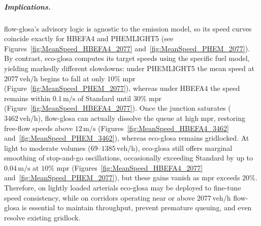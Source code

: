 \subparagraph*{Implications.}
\ac{flow-glosa}’s advisory logic is agnostic to the emission model, so its speed curves coincide exactly for HBEFA4 and PHEMLIGHT5 (see Figures~\ref{fig:MeanSpeed_HBEFA4_2077} and~\ref{fig:MeanSpeed_PHEM_2077}). By contrast, \ac{eco-glosa} computes its target speeds using the specific fuel model, yielding markedly different slowdowns: under PHEMLIGHT5 the mean speed at $2077\,\mathrm{veh/h}$ begins to fall at only $10\%$ \ac{mpr} (Figure~\ref{fig:MeanSpeed_PHEM_2077}), whereas under HBEFA4 the speed remains within $0.1\,\mathrm{m/s}$ of Standard until $30\%$ \ac{mpr} (Figure~\ref{fig:MeanSpeed_HBEFA4_2077}). Once the junction saturates ($3462\,\mathrm{veh/h}$), \ac{flow-glosa} can actually dissolve the queue at high \ac{mpr}, restoring free-flow speeds above $12\,\mathrm{m/s}$ (Figures~\ref{fig:MeanSpeed_HBEFA4_3462} and~\ref{fig:MeanSpeed_PHEM_3462}), whereas \ac{eco-glosa} remains gridlocked. At light to moderate volumes ($69$–$1385\,\mathrm{veh/h}$), \ac{eco-glosa} still offers marginal smoothing of stop-and-go oscillations, occasionally exceeding Standard by up to $0.04\,\mathrm{m/s}$ at $10\%$ \ac{mpr} (Figures~\ref{fig:MeanSpeed_HBEFA4_2077} and~\ref{fig:MeanSpeed_PHEM_2077}), but these gains vanish as \ac{mpr} exceeds $20\%$. Therefore, on lightly loaded arterials \ac{eco-glosa} may be deployed to fine-tune speed consistency, while on corridors operating near or above $2077\,\mathrm{veh/h}$ \ac{flow-glosa} is essential to maintain throughput, prevent premature queuing, and even resolve existing gridlock.

